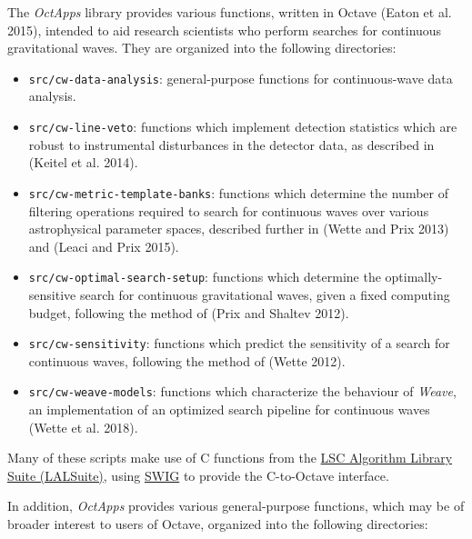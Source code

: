 \documentclass[10pt,a4paper,onecolumn]{article}
\providecommand{\tightlist}{%
  \setlength{\itemsep}{0pt}\setlength{\parskip}{0pt}}
\begin{document}
The \emph{OctApps} library provides various functions, written in Octave
(Eaton et al. 2015), intended to aid research scientists who perform
searches for continuous gravitational waves. They are organized into the
following directories:

\begin{itemize}
\tightlist
\item
  \texttt{src/cw-data-analysis}: general-purpose functions for
  continuous-wave data analysis.
\item
  \texttt{src/cw-line-veto}: functions which implement detection
  statistics which are robust to instrumental disturbances in the
  detector data, as described in (Keitel et al. 2014).
\item
  \texttt{src/cw-metric-template-banks}: functions which determine the
  number of filtering operations required to search for continuous waves
  over various astrophysical parameter spaces, described further in
  (Wette and Prix 2013) and (Leaci and Prix 2015).
\item
  \texttt{src/cw-optimal-search-setup}: functions which determine the
  optimally-sensitive search for continuous gravitational waves, given a
  fixed computing budget, following the method of (Prix and Shaltev
  2012).
\item
  \texttt{src/cw-sensitivity}: functions which predict the sensitivity
  of a search for continuous waves, following the method of (Wette
  2012).
\item
  \texttt{src/cw-weave-models}: functions which characterize the
  behaviour of \emph{Weave}, an implementation of an optimized search
  pipeline for continuous waves (Wette et al. 2018).
\end{itemize}

Many of these scripts make use of C functions from the
\href{https://wiki.ligo.org/DASWG/LALSuite}{LSC Algorithm Library Suite
(LALSuite)}, using \href{http://www.swig.org}{SWIG} to provide the
C-to-Octave interface.

In addition, \emph{OctApps} provides various general-purpose functions,
which may be of broader interest to users of Octave, organized into the
following directories:
\end{document}
